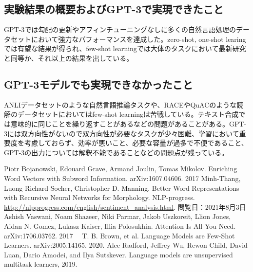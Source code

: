\documentclass[a4j,11pt]{jarticle}
\begin{document}
\subsection*{実験結果の概要およびGPT-3で実現できたこと}
GPT-3では勾配の更新やアフィンチューニングなしに多くの自然言語処理のデータセットにおいて強力なパフォーマンスを達成した。zero-shot, one-shot learingでは有望な結果が得られ、few-shot learningでは大体のタスクにおいて最新研究と同等か、それ以上の結果を出している。

\subsection*{GPT-3モデルでも実現できなかったこと}
ANLIデータセットのような自然言語推論タスクや、RACEやQuACのような読解のデータセットにおいてはfew-shot learningは苦戦している。テキスト合成では意味的に同じことを繰り返すことがあるなどの問題があることがある。GPT-3には双方向性がないので双方向性が必要なタスクが少々困難、学習において重要度を考慮しておらず、効率が悪いこと、必要な容量が過多で不便であること、GPT-3の出力については解釈不能であることなどの問題点が残っている。

\newpage
\begin{thebibliography}{99}
     Piotr Bojanowski, Edouard Grave, Armand Joulin, Tomas Mikolov. Enriching Word Vectors with Subword Information. arXiv:1607.04606. 2017
     Minh-Thang, Luong Richard Socher, Christopher D. Manning. Better Word Representations with Recursive Neural Networks for Morphology.
     NLP-progress. \url{http://nlpprogress.com/english/sentiment_analysis.html}. 閲覧日：2021年8月3日
     Ashish Vaswani, Noam Shazeer, Niki Parmar, Jakob Uszkoreit, Llion Jones, Aidan N. Gomez, Lukasz Kaiser, Illia Polosukhin. Attention Is All You Need. arXiv:1706.03762. 2017
    　T. B. Brown, et al. Language Models are Few-Shot Learners. arXiv:2005.14165.
    2020.
     Alec Radford, Jeffrey Wu, Rewon Child, David Luan, Dario Amodei, and Ilya Sutskever. Language
    models are unsupervised multitask learners, 2019.

\end{thebibliography}
\end{document}
